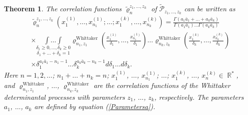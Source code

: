\documentclass[12pt]{amsart}
\newtheorem{thm}{Theorem}[section]
\theoremstyle{definition}
\numberwithin{equation}{section}
\DeclareMathOperator{\R}{\mathbb{R}}
\DeclareMathOperator{\Whittaker}{Whittaker}
\begin{document}
\begin{thm}\label{MAINTHEOREMCORRELATIONS} The correlation functions $\widetilde{\varrho}_n^{z_1,\ldots,z_k}$ of $\widetilde{\mathcal{P}}_{z_1,\ldots,z_k}$
can be written as
\begin{equation}\label{MainFormulaCorF}
\begin{split}
&\widetilde{\varrho}_n^{z_1,\ldots,z_k}\left(x_1^{(1)},\ldots,x^{(1)}_{n_1};\ldots;x_1^{(k)},\ldots,x_{n_k}^{(k)}\right)
=\frac{\Gamma\left(a_1\bar{a}_1+\ldots+a_k\bar{a}_k\right)}{\Gamma\left(a_1\bar{a}_1\right)\ldots\Gamma\left(a_k\bar{a}_k\right)}\\
&\times\underset{\delta_1+\ldots+\delta_k=1}{\underset{\delta_1\geq 0,\ldots, \delta_k\geq 0}{\int\ldots\int}}
\varrho_{n_1,z_1}^{\Whittaker}\left(\frac{x_1^{(1)}}{\delta_1},\ldots,\frac{x_{n_1}^{(1)}}{\delta_1}\right)
\ldots\varrho_{n_k,z_k}^{\Whittaker}\left(\frac{x_1^{(k)}}{\delta_k},\ldots,\frac{x_{n_k}^{(k)}}{\delta_k}\right)\\
&\times\delta_1^{a_1\bar{a}_1-n_1-1}\ldots\delta_k^{a_k\bar{a}_k-n_k-1}d\delta_1\ldots
d\delta_{k}.
\end{split}
\end{equation}
Here $n=1,2,\ldots$; $n_1+\ldots+n_k=n$; $x_1^{(1)}$, $\ldots$, $x_{n_1}^{(1)}$; $\ldots$;
$x_1^{(k)}$, $\ldots$, $x_n^{(k)}\in\R^{\ast}$, and
$\varrho_{n_1,z_1}^{\Whittaker}$, $\ldots$, $\varrho_{n_k,z_k}^{\Whittaker}$ are the correlation functions of the Whittaker
determinantal processes with parameters $z_1$, $\ldots$, $z_k$, respectively. The parameters $a_1$, $\ldots$, $a_k$ are defined by equation (\ref{Parametersa}).
\end{thm}
\end{document}
